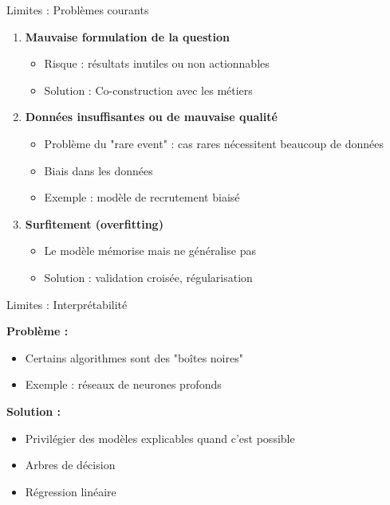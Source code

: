 \begin{frame}{Limites : Problèmes courants}

\begin{enumerate}
    \item<+-> \textbf{Mauvaise formulation de la question}
        \begin{itemize}
            \item Risque : résultats inutiles ou non actionnables
            \item Solution : Co-construction avec les métiers
        \end{itemize}

    \vspace{0.2cm}
    \item<+-> \textbf{Données insuffisantes ou de mauvaise qualité}
        \begin{itemize}
            \item Problème du "rare event" : cas rares nécessitent beaucoup de données
            \item Biais dans les données
            \item Exemple : modèle de recrutement biaisé
        \end{itemize}

    \vspace{0.2cm}
    \item<+-> \textbf{Surfitement (overfitting)}
        \begin{itemize}
            \item Le modèle mémorise mais ne généralise pas
            \item Solution : validation croisée, régularisation
        \end{itemize}
\end{enumerate}

\end{frame}

\begin{frame}{Limites : Interprétabilité}

\textbf{Problème :}

\vspace{0.3cm}

\begin{itemize}
    \item Certains algorithmes sont des "boîtes noires"
    \item Exemple : réseaux de neurones profonds
\end{itemize}

\vspace{0.5cm}

\textbf{Solution :}
\begin{itemize}
    \item Privilégier des modèles explicables quand c'est possible
    \item Arbres de décision
    \item Régression linéaire
\end{itemize}

\end{frame}

